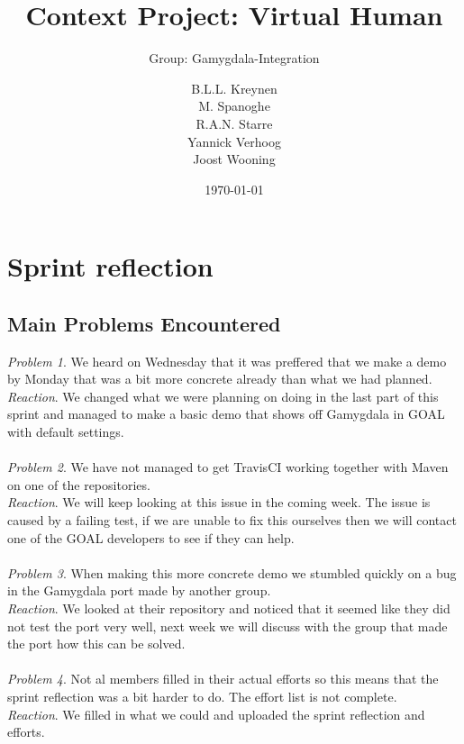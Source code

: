 \documentclass{scrartcl}
\begin{document}
\title{Context Project: Virtual Human}
\subtitle{Group: Gamygdala-Integration}
\date{\today{}}

\author{
    \begin{tabular}{l r}
      B.L.L. Kreynen\\
      M. Spanoghe\\
      R.A.N. Starre\\
      Yannick Verhoog\\
      Joost Wooning\\
    \end{tabular}
}

\maketitle \thispagestyle{empty} \pagebreak

\section{Sprint reflection}

\subsection{Main Problems Encountered}

\emph{Problem 1}. We heard on Wednesday that it was preffered that we make a demo by Monday that was a bit more concrete already than what we had planned.\\
\emph{Reaction}. We changed what we were planning on doing in the last part of this sprint and managed to make a basic demo that shows off Gamygdala in GOAL with default settings.\\
\\
\emph{Problem 2}. We have not managed to get TravisCI working together with Maven on one of the repositories.\\
\emph{Reaction}. We will keep looking at this issue in the coming week. The issue is caused by a failing test, if we are unable to fix this ourselves then we will contact one of the GOAL developers to see if they can help.\\
\\
\emph{Problem 3}. When making this more concrete demo we stumbled quickly on a bug in the Gamygdala port made by another group.\\
\emph{Reaction}. We looked at their repository and noticed that it seemed like they did not test the port very well, next week we will discuss with the group that made the port how this can be solved.\\
\\
\emph{Problem 4}. Not al members filled in their actual efforts so this means that the sprint reflection was a bit harder to do. The effort list is not complete. \\
\emph{Reaction}. We filled in what we could and uploaded the sprint reflection and efforts.\\
\\
\end{document}
